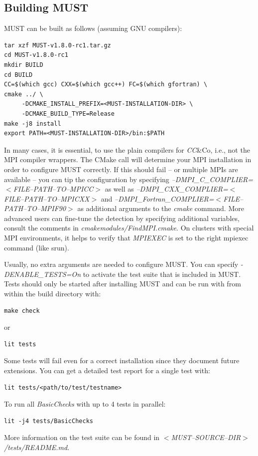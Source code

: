 \documentclass[english]{scrartcl}
\begin{document}
\subsection{Building MUST}
MUST can be built as follows (assuming GNU compilers):
\begin{verbatim}
tar xzf MUST-v1.8.0-rc1.tar.gz
cd MUST-v1.8.0-rc1
mkdir BUILD
cd BUILD
CC=$(which gcc) CXX=$(which gcc++) FC=$(which gfortran) \
cmake ../ \
     -DCMAKE_INSTALL_PREFIX=<MUST-INSTALLATION-DIR> \
     -DCMAKE_BUILD_TYPE=Release
make -j8 install
export PATH=<MUST-INSTALLATION-DIR>/bin:$PATH
\end{verbatim}

In many cases, it is essential, to use the plain compilers for \emph{CC}\&Co, i.e., not
the MPI compiler wrappers.
The CMake call will determine your MPI installation in order to configure
MUST correctly. If this should fail -- or multiple MPIs are available -- you
can tip the configuration by specifying
\emph{\mbox{--}DMPI\_C\_COMPLIER=$<$FILE\mbox{--}PATH\mbox{--}TO\mbox{--}MPICC$>$} as well as
\emph{\mbox{--}DMPI\_CXX\_COMPLIER=$<$FILE\mbox{--}PATH\mbox{--}TO\mbox{--}MPICXX$>$} and
\emph{\mbox{--}DMPI\_Fortran\_COMPLIER=$<$FILE\mbox{--}PATH\mbox{--}TO\mbox{--}MPIF90$>$} as additional
arguments to the \emph{cmake} command. More advanced users can fine-tune the
detection by specifying additional variables, consult the comments in
\emph{cmakemodules/FindMPI.cmake}. On clusters with special MPI environments, it helps to 
verify that \emph{MPIEXEC} is set to the right mpiexec command (like srun).

Usually, no extra arguments are needed to configure MUST. You can specify
\emph{-DENABLE\_TESTS=On} to activate the test suite that is included in MUST.
Tests should only be started after installing MUST and can be run with from within the build directory with:
\begin{verbatim}
make check
\end{verbatim}
or
\begin{verbatim}
lit tests
\end{verbatim}
Some tests will fail even for a correct installation since they document
future extensions. You can get a detailed test report for a single test with:
\begin{verbatim}
lit tests/<path/to/test/testname>
\end{verbatim}
To run all \emph{BasicChecks} with up to 4 tests in parallel:
\begin{verbatim}
lit -j4 tests/BasicChecks
\end{verbatim}
More information on the test suite can be found in \emph{$<$MUST\mbox{--}SOURCE\mbox{--}DIR$>$/tests/README.md}.
\end{document}
